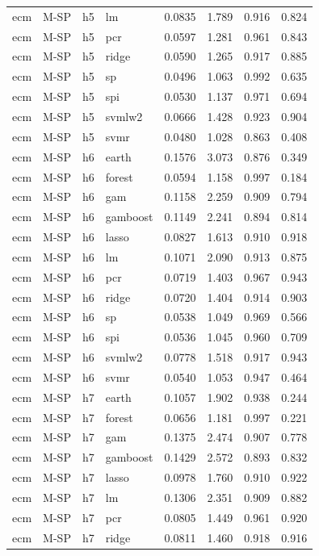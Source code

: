 \begin{ThreePartTable}
\begin{longtable}[t]{llclcccc}
ecm & M-SP & h5 & lm & 0.0835 & 1.789 & 0.916 & 0.824\\
ecm & M-SP & h5 & pcr & 0.0597 & 1.281 & 0.961 & 0.843\\
ecm & M-SP & h5 & ridge & 0.0590 & 1.265 & 0.917 & 0.885\\
ecm & M-SP & h5 & sp & 0.0496 & 1.063 & 0.992 & 0.635\\
ecm & M-SP & h5 & spi & 0.0530 & 1.137 & 0.971 & 0.694\\
ecm & M-SP & h5 & svmlw2 & 0.0666 & 1.428 & 0.923 & 0.904\\
ecm & M-SP & h5 & svmr & 0.0480 & 1.028 & 0.863 & 0.408\\
\addlinespace
ecm & M-SP & h6 & earth & 0.1576 & 3.073 & 0.876 & 0.349\\
ecm & M-SP & h6 & forest & 0.0594 & 1.158 & 0.997 & 0.184\\
ecm & M-SP & h6 & gam & 0.1158 & 2.259 & 0.909 & 0.794\\
ecm & M-SP & h6 & gamboost & 0.1149 & 2.241 & 0.894 & 0.814\\
ecm & M-SP & h6 & lasso & 0.0827 & 1.613 & 0.910 & 0.918\\
ecm & M-SP & h6 & lm & 0.1071 & 2.090 & 0.913 & 0.875\\
ecm & M-SP & h6 & pcr & 0.0719 & 1.403 & 0.967 & 0.943\\
ecm & M-SP & h6 & ridge & 0.0720 & 1.404 & 0.914 & 0.903\\
ecm & M-SP & h6 & sp & 0.0538 & 1.049 & 0.969 & 0.566\\
ecm & M-SP & h6 & spi & 0.0536 & 1.045 & 0.960 & 0.709\\
ecm & M-SP & h6 & svmlw2 & 0.0778 & 1.518 & 0.917 & 0.943\\
ecm & M-SP & h6 & svmr & 0.0540 & 1.053 & 0.947 & 0.464\\
\addlinespace
ecm & M-SP & h7 & earth & 0.1057 & 1.902 & 0.938 & 0.244\\
ecm & M-SP & h7 & forest & 0.0656 & 1.181 & 0.997 & 0.221\\
ecm & M-SP & h7 & gam & 0.1375 & 2.474 & 0.907 & 0.778\\
ecm & M-SP & h7 & gamboost & 0.1429 & 2.572 & 0.893 & 0.832\\
ecm & M-SP & h7 & lasso & 0.0978 & 1.760 & 0.910 & 0.922\\
ecm & M-SP & h7 & lm & 0.1306 & 2.351 & 0.909 & 0.882\\
ecm & M-SP & h7 & pcr & 0.0805 & 1.449 & 0.961 & 0.920\\
ecm & M-SP & h7 & ridge & 0.0811 & 1.460 & 0.918 & 0.916\\

\end{longtable}
\end{ThreePartTable}
